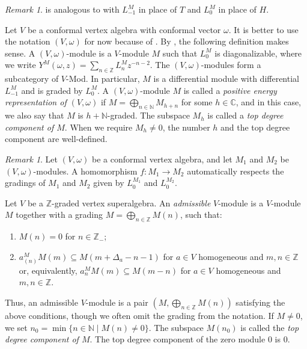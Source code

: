 \documentclass[a4paper, 12pt, reqno]{amsart}
\theoremstyle{remark}
\newtheorem{remark}[theorem]{Remark}
\begin{document}
\begin{remark}
  \label{rmk:24}
   is analogous to  with $L_{-1}^M$ in place of $T$ and $L_0^M$ in place of $H$.
\end{remark}

Let $V$ be a conformal vertex algebra with conformal vector $\omega$.
It is better to use the notation $(V, \omega)$ for now because of .
By , the following definition makes sense. A $(V, \omega)$-module is a $V$-module $M$ such that $L^M_0$ is diagonalizable, where we write $Y^M(\omega, z) = \sum_{n \in \mathbb{Z}}L^M_nz^{-n - 2}$.
The $(V, \omega)$-modules form a subcategory of $V$-Mod.
In particular, $M$ is a differential module with differential $L^M_{-1}$ and is graded by $L^M_0$.
A $(V, \omega)$-module $M$ is called a \emph{positive energy representation of $(V, \omega)$} if $M = \bigoplus_{n \in \mathbb{N}}M_{h + n}$ for some $h \in \mathbb{C}$, and in this case, we also say that $M$ is $h + \mathbb{N}$-graded.
The subspace $M_h$ is called a \emph{top degree component of $M$}.
When we require $M_h \neq 0$, the number $h$ and the top degree component are well-defined.

\begin{remark}
  \label{rmk:25}
  Let $(V, \omega)$ be a conformal vertex algebra, and let $M_1$ and $M_2$ be $(V, \omega)$-modules.
  A homomorphism $f: M_1 \to M_2$ automatically respects the gradings of $M_1$ and $M_2$ given by $L_0^{M_1}$ and $L_0^{M_2}$.
\end{remark}

Let $V$ be a $\mathbb{Z}$-graded vertex superalgebra.
An \emph{admissible} $V$-module is a $V$-module $M$ together with a grading $M = \bigoplus_{n \in \mathbb{Z}}M(n)$, such that:
\begin{enumerate}
\item $M(n) = 0$ for $n \in \mathbb{Z}_-$;
\item $a^M_{(n)}M(m) \subseteq M(m + \Delta_a - n - 1)$ for $a \in V$ homogeneous and $m, n \in \mathbb{Z}$ or, equivalently, $a^M_nM(m) \subseteq M(m - n)$ for $a \in V$ homogeneous and $m, n \in \mathbb{Z}$.
\end{enumerate}

Thus, an admissible $V$-module is a pair $(M, \bigoplus_{n \in \mathbb{Z}}M(n))$ satisfying the above conditions, though we often omit the grading from the notation.
If $M \neq 0$, we set $n_0 = \min\{n \in \mathbb{N} \mid M(n) \neq 0\}$.
The subspace $M(n_0)$ is called the \emph{top degree component of $M$}.
The top degree component of the zero module $0$ is $0$.
\end{document}

